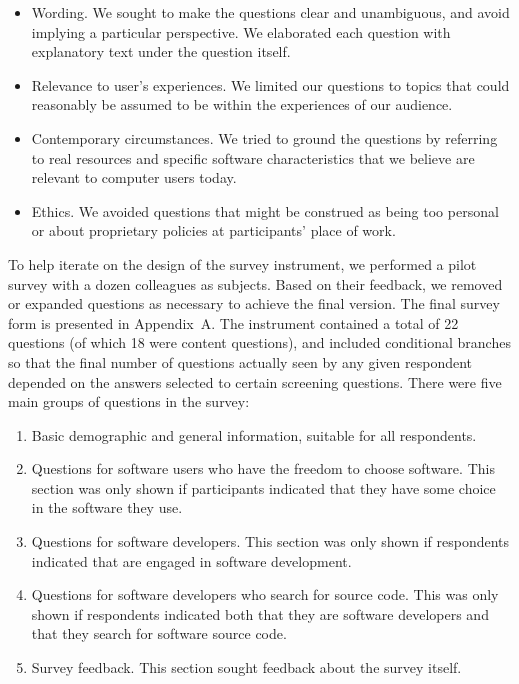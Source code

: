\documentclass[review]{elsarticle}
\begin{document}
\begin{itemize}

\item Wording.  We sought to make the questions clear and unambiguous, and avoid implying a particular perspective.  We elaborated each question with explanatory text under the question itself.

\item Relevance to user's experiences.  We limited our questions to topics that could reasonably be assumed to be within the experiences of our audience.

\item Contemporary circumstances.  We tried to ground the questions by referring to real resources and specific software characteristics that we believe are relevant to computer users today.

\item Ethics.  We avoided questions that might be construed as being too personal or about proprietary policies at participants' place of work.

\end{itemize}

To help iterate on the design of the survey instrument, we performed a pilot survey with a dozen colleagues as subjects.  Based on their feedback, we removed or expanded questions as necessary to achieve the final version.  The final survey form is presented in Appendix~A.  The instrument contained a total of 22 questions (of which 18 were content questions), and included conditional branches so that the final number of questions actually seen by any given respondent depended on the answers selected to certain screening questions.  There were five main groups of questions in the survey:

\begin{enumerate}

\item Basic demographic and general information, suitable for all respondents.

\item Questions for software users who have the freedom to choose software.  This section was only shown if participants indicated that they have some choice in the software they use.

\item Questions for software developers.  This section was only shown if respondents indicated that are engaged in software development.

\item Questions for software developers who search for source code.  This was only shown if respondents indicated both that they are software developers and that they search for software source code.

\item Survey feedback.  This section sought feedback about the survey itself.

\end{enumerate}
\end{document}
